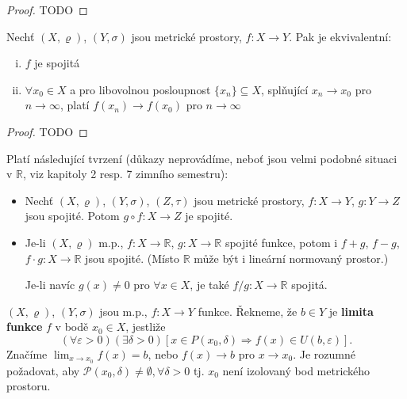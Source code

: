 \begin{proof}
  TODO
\end{proof}

\begin{veta}
Nechť $(X, \varrho)$, $(Y, \sigma)$ jsou metrické prostory, $f: X \to Y$. Pak je ekvivalentní:

\begin{enumerate}[i.]
    \item $f$ je spojitá
    \item $\forall x_0 \in X$ a pro libovolnou posloupnost $\{x_n\} \subseteq X$, splňující $x_n \to x_0$ pro $n \to \infty$, platí $f(x_n) \to f(x_0)$ pro $n \to \infty$
\end{enumerate}
\end{veta}

\begin{proof}
  TODO
\end{proof}

\begin{poznamka}
Platí následující tvrzení (důkazy neprovádíme, neboť jsou velmi podobné situaci v $\mathbb R$, viz kapitoly 2 resp. 7 zimního semestru):

\begin{itemize}
    \item Nechť $(X, \varrho)$, $(Y, \sigma)$, $(Z, \tau)$ jsou metrické prostory, $f: X \to Y$, $g: Y \to Z$ jsou spojité. Potom $g \circ f: X \to Z$ je spojité.

    \item Je-li $(X, \varrho)$ m.p., $f: X \to \mathbb R$, $g: X \to \mathbb R$ spojité funkce, potom i $f + g$, $f - g$, $f \cdot g: X \to \mathbb R$ jsou spojité. (Místo $\mathbb R$ může být i lineární normovaný prostor.)

    Je-li navíc $g(x) \neq 0$ pro $\forall x \in X$, je také $f / g: X \to \mathbb R$ spojitá.
\end{itemize}
\end{poznamka}

\begin{definice}
$(X, \varrho)$, $(Y, \sigma)$ jsou m.p., $f: X \to Y$ funkce. Řekneme, že $b \in Y$ je \textbf{limita funkce} $f$ v bodě $x_0 \in X$, jestliže
\[
\left(\forall \varepsilon > 0\right) \left(\exists \delta > 0\right) \left[ x \in P(x_0, \delta) \Longrightarrow f(x) \in U(b, \varepsilon) \right].
\]
Značíme $\lim_{x\to x_0}f(x) = b$, nebo $f(x)\rightarrow b$ pro $x\to x_0$. Je rozumné požadovat, aby $\mathscr P(x_0, \delta) \neq \emptyset,  \forall \delta >0$ tj. $x_0$ není izolovaný bod metrického prostoru.
\end{definice}

